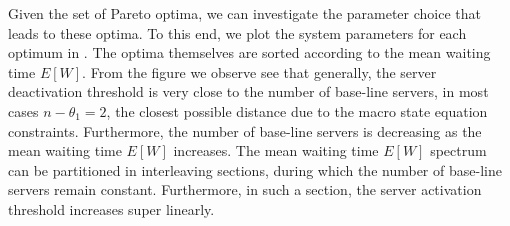 Given the set of Pareto optima, we can investigate the parameter choice that leads to these optima.
To this end, we plot the system parameters for each optimum in .
The optima themselves are sorted according to the mean waiting time \(E[W]\).
From the figure we observe see that generally, the server deactivation threshold is very close to the number of base-line servers, in most cases \(n - \theta_1 = 2\), the closest possible distance due to the macro state equation constraints.
Furthermore, the number of base-line servers is decreasing as the mean waiting time \(E[W]\) increases. 
The mean waiting time \(E[W]\) spectrum can be partitioned in interleaving sections, during which the number of base-line servers remain constant.
Furthermore, in such a section, the server activation threshold increases super linearly.

